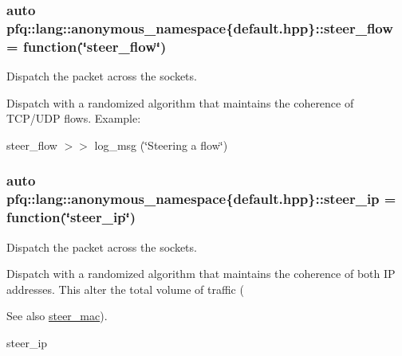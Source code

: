 \subsubsection[{\texorpdfstring{steer\+\_\+flow}{steer_flow}}]{\setlength{\rightskip}{0pt plus 5cm}auto pfq\+::lang\+::anonymous\+\_\+namespace\{default.\+hpp\}\+::steer\+\_\+flow = {\bf function}(\char`\"{}steer\+\_\+flow\char`\"{})}\hypertarget{namespacepfq_1_1lang_1_1anonymous__namespace_02default_8hpp_03_adeb44c976ac903e7b13addb65ac41f9f}{}\label{namespacepfq_1_1lang_1_1anonymous__namespace_02default_8hpp_03_adeb44c976ac903e7b13addb65ac41f9f}


Dispatch the packet across the sockets. 

Dispatch with a randomized algorithm that maintains the coherence of T\+C\+P/\+U\+DP flows. Example\+:

steer\+\_\+flow $>$$>$ log\+\_\+msg (\char`\"{}\+Steering a flow\char`\"{}) 
\subsubsection[{\texorpdfstring{steer\+\_\+ip}{steer_ip}}]{\setlength{\rightskip}{0pt plus 5cm}auto pfq\+::lang\+::anonymous\+\_\+namespace\{default.\+hpp\}\+::steer\+\_\+ip = {\bf function}(\char`\"{}steer\+\_\+ip\char`\"{})}\hypertarget{namespacepfq_1_1lang_1_1anonymous__namespace_02default_8hpp_03_afe1c69c555a75021f7e637086cb1264c}{}\label{namespacepfq_1_1lang_1_1anonymous__namespace_02default_8hpp_03_afe1c69c555a75021f7e637086cb1264c}


Dispatch the packet across the sockets. 

Dispatch with a randomized algorithm that maintains the coherence of both IP addresses. This alter the total volume of traffic (\begin{DoxySeeAlso}{See also}
\hyperlink{namespacepfq_1_1lang_1_1anonymous__namespace_02default_8hpp_03_ad51e91e3b485c729ac1ba39a46e337a0}{steer\+\_\+mac}).
\end{DoxySeeAlso}
steer\+\_\+ip 
